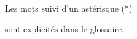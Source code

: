 \huge
\null
\vfill
\centerline{Les mots suivi d'un astérisque (*)}
\centerline{sont explicités dans le glossaire.}
\vfill
\null\bbb\null
\normalsize
\clearpage
